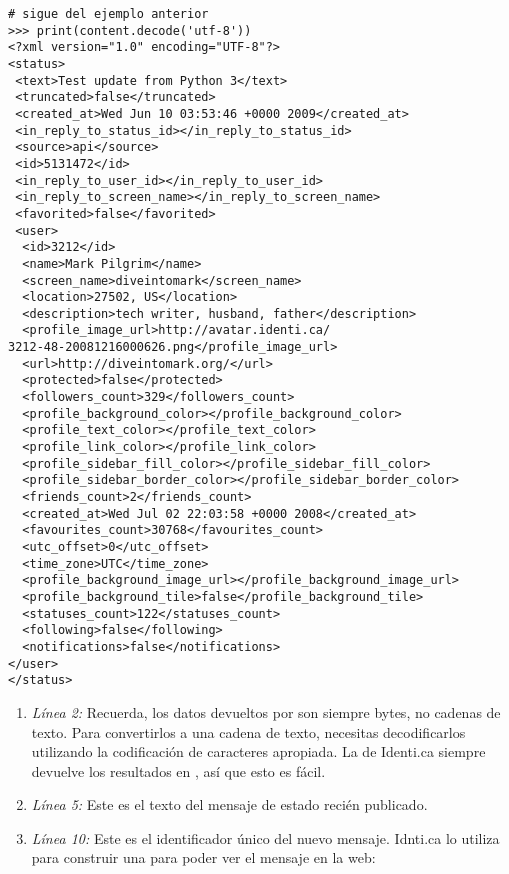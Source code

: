 \noindent\begin{minipage}{\textwidth}
\begin{lstlisting}[mathescape=False]
# sigue del ejemplo anterior
>>> print(content.decode('utf-8'))
<?xml version="1.0" encoding="UTF-8"?>
<status>
 <text>Test update from Python 3</text> 
 <truncated>false</truncated>
 <created_at>Wed Jun 10 03:53:46 +0000 2009</created_at>
 <in_reply_to_status_id></in_reply_to_status_id>
 <source>api</source>
 <id>5131472</id>                      
 <in_reply_to_user_id></in_reply_to_user_id>
 <in_reply_to_screen_name></in_reply_to_screen_name>
 <favorited>false</favorited>
 <user>
  <id>3212</id>
  <name>Mark Pilgrim</name>
  <screen_name>diveintomark</screen_name>
  <location>27502, US</location>
  <description>tech writer, husband, father</description>
  <profile_image_url>http://avatar.identi.ca/
3212-48-20081216000626.png</profile_image_url>
  <url>http://diveintomark.org/</url>
  <protected>false</protected>
  <followers_count>329</followers_count>
  <profile_background_color></profile_background_color>
  <profile_text_color></profile_text_color>
  <profile_link_color></profile_link_color>
  <profile_sidebar_fill_color></profile_sidebar_fill_color>
  <profile_sidebar_border_color></profile_sidebar_border_color>
  <friends_count>2</friends_count>
  <created_at>Wed Jul 02 22:03:58 +0000 2008</created_at>
  <favourites_count>30768</favourites_count>
  <utc_offset>0</utc_offset>
  <time_zone>UTC</time_zone>
  <profile_background_image_url></profile_background_image_url>
  <profile_background_tile>false</profile_background_tile>
  <statuses_count>122</statuses_count>
  <following>false</following>
  <notifications>false</notifications>
</user>
</status>
\end{lstlisting}
\end{minipage}

\begin{enumerate}

\item \emph{Línea 2:} Recuerda, los datos devueltos por  son siempre bytes, no cadenas de texto. Para convertirlos a una cadena de texto, necesitas decodificarlos utilizando la codificación de caracteres apropiada. La  de Identi.ca siempre devuelve los resultados en , así que esto es fácil.

\item \emph{Línea 5:} Este es el texto del mensaje de estado recién publicado.

\item \emph{Línea 10:} Este es el identificador único del nuevo mensaje. Idnti.ca lo utiliza para construir una  para poder ver el mensaje en la web: 

\end{enumerate}


